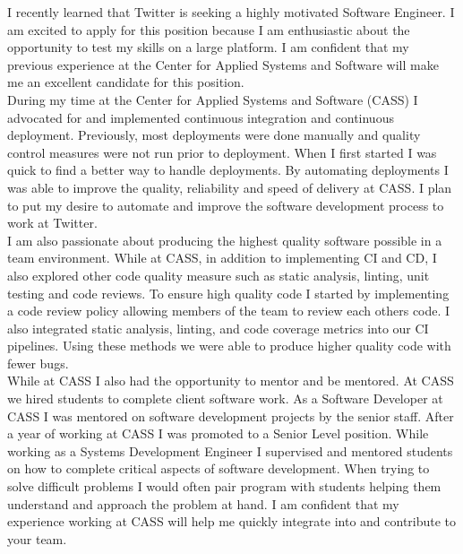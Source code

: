 \documentclass[11pt, a4paper]{awesome-cv}
\begin{document}
\makecvheader

\makelettertitle



\begin{cvletter}
    I recently learned that Twitter is seeking a highly motivated Software Engineer. I am excited to apply for this position because I am enthusiastic about the opportunity to test my skills on a large platform. I am confident that my previous experience at the Center for Applied Systems and Software will make me an excellent candidate for this position.\\
    
    During my time at the Center for Applied Systems and Software (CASS) I advocated for and implemented continuous integration and continuous deployment. Previously, most deployments were done manually and quality control measures were not run prior to deployment. When I first started I was quick to find a better way to handle deployments. By automating deployments I was able to improve the quality, reliability and speed of delivery at CASS. I plan to put my desire to automate and improve the software development process to work at Twitter.\\
    
    I am also passionate about producing the highest quality software possible in a team environment. While at CASS, in addition to implementing CI and CD, I also explored other code quality measure such as static analysis, linting, unit testing and code reviews. To ensure high quality code I started by implementing a code review policy allowing members of the team to review each others code. I also integrated static analysis, linting, and code coverage metrics into our CI pipelines. Using these methods we were able to produce higher quality code with fewer bugs.\\
    
    While at CASS I also had the opportunity to mentor and be mentored. At CASS we hired students to complete client software work. As a Software Developer at CASS I was mentored on software development projects by the senior staff. After a year of working at CASS I was promoted to a Senior Level position. While working as a Systems Development Engineer I supervised and mentored students on how to complete critical aspects of software development. When trying to solve difficult problems I would often pair program with students helping them understand and approach the problem at hand. I am confident that my experience working at CASS will help me quickly integrate into and contribute to your team.\\
    

\end{cvletter}
\end{document}
